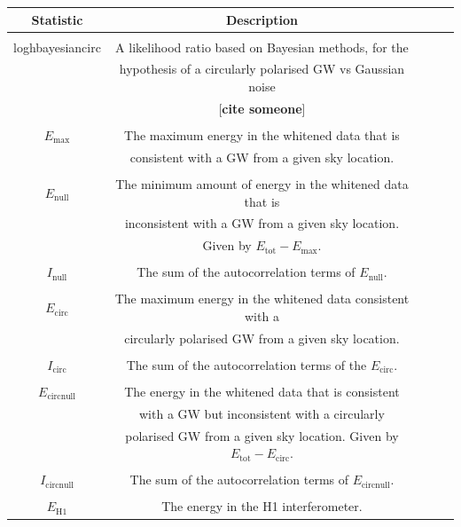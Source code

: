 \documentclass[11pt]{cuthesis}
\begin{document}
 \begin{table}
\begin{tabular}{| c | c | c | c | c |} 
 \hline
\textbf{Statistic }& \textbf{Description}  \\ [0.5ex] 
 \hline\hline
& \\ 
loghbayesiancirc & A likelihood ratio based on Bayesian methods, for the \\ & hypothesis of a circularly polarised GW vs Gaussian noise\\ & [\textbf{cite someone}]  \\

\hline
& \\
$E_\text{max}$ & The maximum energy in the whitened data that is \\ & consistent with a GW from a given sky location. \\

\hline
& \\
$E_\text{null}$& The minimum amount of energy in the whitened data that is\\ & inconsistent with a GW from a given sky location. \\ & Given by $E_\text{tot}-E_\text{max}$. \\
\hline
& \\
$I_\text{null}$& The sum of the autocorrelation terms of $E_\text{null}$. \\

\hline
& \\
$E_\text{circ}$ & The maximum energy in the whitened data consistent with a\\ & circularly polarised GW from a given sky location.  \\
\hline
& \\
$I_\text{circ}$ & The sum of the autocorrelation terms of the $E_\text{circ}$. \\

\hline
& \\
$E_\text{circnull}$ & The energy in the whitened data that is consistent \\ & with a GW but inconsistent with a circularly \\ & polarised GW from a given sky location. Given by $E_\text{tot}-E_\text{circ}$. \\

\hline
& \\
$I_\text{circnull}$& The sum of the autocorrelation terms of $E_\text{circnull}$.  \\
\hline
& \\
$E_\text{H1}$& The energy in the H1 interferometer. \\


\end{tabular}
\end{table}
\end{document}
